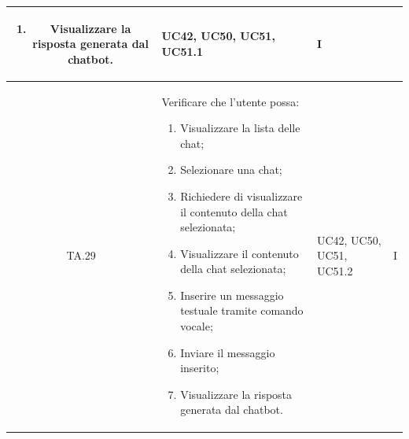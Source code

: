 \begin{xltabular}{\textwidth}{|c|X|p{2.5cm}|c|}
\begin{enumerate}
    \item Visualizzare la risposta generata dal chatbot.
\end{enumerate}
& UC42, UC50, UC51, UC51.1 & I \\
\hline
TA.29 & Verificare che l'utente possa:
\begin{enumerate}
    \item Visualizzare la lista delle chat;
    \item Selezionare una chat;
    \item Richiedere di visualizzare il contenuto della chat selezionata;
    \item Visualizzare il contenuto della chat selezionata;
    \item Inserire un messaggio testuale tramite comando vocale;
    \item Inviare il messaggio inserito;
    \item Visualizzare la risposta generata dal chatbot.
\end{enumerate}
& UC42, UC50, UC51, UC51.2 & I \\
\hline


\end{xltabular}


